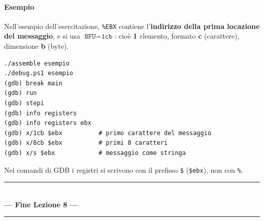 \documentclass[11pt,a4paper]{article}
\newcommand{\reg}[1]{\texttt{\%#1}}
\begin{document}
\paragraph*{Esempio}

Nell'esempio dell'esercitazione, \reg{EBX} contiene l'\textbf{indirizzo della prima locazione del messaggio}, e si usa $\texttt{NFU}=\texttt{1cb}$: cioè \textbf{1} elemento, formato \textbf{c} (carattere), dimensione \textbf{b} (byte).

\begin{integrazione}
\begin{lstlisting}
./assemble esempio
./debug.ps1 esempio
(gdb) break main
(gdb) run
(gdb) stepi
(gdb) info registers
(gdb) info registers ebx
(gdb) x/1cb $ebx          # primo carattere del messaggio
(gdb) x/8cb $ebx          # primi 8 caratteri
(gdb) x/s $ebx            # messaggio come stringa
\end{lstlisting}
Nei comandi di GDB i registri si scrivono con il prefisso \texttt{\$} (\texttt{\$ebx}), non con \texttt{\%}.
\end{integrazione}

	\vspace{1.5cm}
	\begin{center}
		\rule{0.65\textwidth}{1pt} \\
		\vspace{0.4cm}
		\textcolor{titlecolor}{\LARGE \textbf{--- Fine Lezione 8 ---}} \\
		\vspace{0.2cm}
		\rule{0.65\textwidth}{1pt}
	\end{center}
	\newpage
\end{document}

